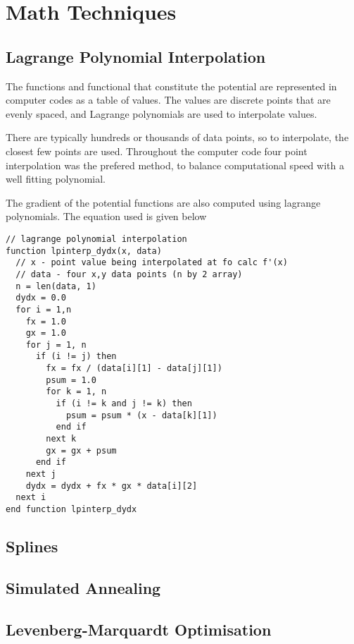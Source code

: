 \section{Math Techniques}

\subsection{Lagrange Polynomial Interpolation}

The functions and functional that constitute the potential are represented in computer codes as a table of values.  The values are discrete points that are evenly spaced, and Lagrange polynomials are used to interpolate values.

\eqLagrangeDataSet

\eqLagrangePolynomialNew



There are typically hundreds or thousands of data points, so to interpolate, the closest few points are used.  Throughout the computer code four point interpolation was the prefered method, to balance computational speed with a well fitting polynomial.  

The gradient of the potential functions are also computed using lagrange polynomials.  The equation used is given below

\eqLagrangePolynomialDerivativeNew


\begin{lstlisting}[style=sPseudo,caption={}]
// lagrange polynomial interpolation
function lpinterp_dydx(x, data)
  // x - point value being interpolated at fo calc f'(x)
  // data - four x,y data points (n by 2 array)
  n = len(data, 1)
  dydx = 0.0
  for i = 1,n
    fx = 1.0
    gx = 1.0
    for j = 1, n
      if (i != j) then
        fx = fx / (data[i][1] - data[j][1])
        psum = 1.0
        for k = 1, n
          if (i != k and j != k) then
            psum = psum * (x - data[k][1])
          end if
        next k
        gx = gx + psum
      end if
    next j
    dydx = dydx + fx * gx * data[i][2]
  next i
end function lpinterp_dydx
\end{lstlisting}





\subsection{Splines}



\subsection{Simulated Annealing}



\subsection{Levenberg-Marquardt Optimisation}


